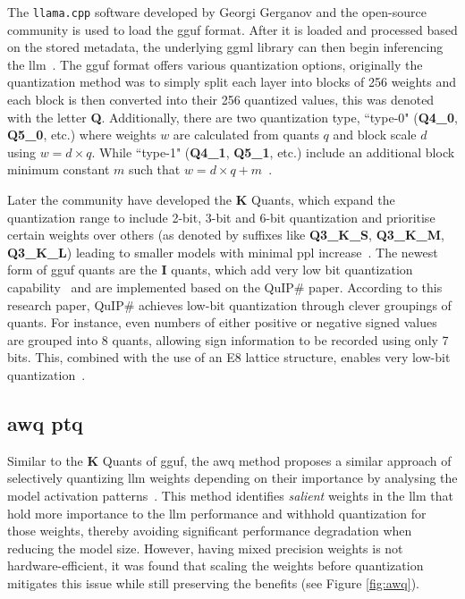 \documentclass{ifacconf}
\begin{document}
	The \texttt{llama.cpp} software developed by Georgi Gerganov and the open-source community is used to load the \gls{gguf} format. After it is loaded and processed based on the stored metadata, the underlying \gls{ggml} library can then begin inferencing the \gls{llm}~\cite{ggufgithub}. The \gls{gguf} format offers various quantization options, originally the quantization method was to simply split each layer into blocks of 256 weights and each block is then converted into their 256 quantized values, this was denoted with the letter \textbf{Q}. Additionally, there are two quantization type, ``type-0" (\textbf{Q4\_0}, \textbf{Q5\_0}, etc.) where weights $w$ are calculated from quants $q$ and block scale $d$ using $w = d \times q$. While ``type-1" (\textbf{Q4\_1}, \textbf{Q5\_1}, etc.) include an additional block minimum constant $m$ such that $w = d \times q + m$~\cite{ggufgithubquantdoc, ggufgithubkquantpr}. 
	
	Later the community have developed the \textbf{K} Quants, which expand the quantization range to include 2-bit, 3-bit and 6-bit quantization and prioritise certain weights over others (as denoted by suffixes like \textbf{Q3\_K\_S}, \textbf{Q3\_K\_M}, \textbf{Q3\_K\_L}) leading to smaller models with minimal \gls{ppl} increase~\cite{ggufgithubkquantpr}. The newest form of \gls{gguf} quants are the \textbf{I} quants, which add very low bit quantization capability~\cite{ggufgithubiquantpr} and are implemented based on the QuIP\# paper. According to this research paper, QuIP\# achieves low-bit quantization through clever groupings of quants. For instance, even numbers of either positive or negative signed values are grouped into 8 quants, allowing sign information to be recorded using only 7 bits. This, combined with the use of an E8 lattice structure, enables very low-bit quantization~\cite{tseng2024quipbetterllmquantization,ggufgithubiquantpr}. 
	
	
	\subsection{\gls{awq} \gls{ptq}}
	
	Similar to the \textbf{K} Quants of \gls{gguf}, the \gls{awq} method proposes a similar approach of selectively quantizing \gls{llm} weights depending on their importance by analysing the model activation patterns~\cite{lin2024awqactivationawareweightquantization}. This method identifies \textit{salient} weights in the \gls{llm} that hold more importance to the \gls{llm} performance and withhold quantization for those weights, thereby avoiding significant performance degradation when reducing the model size. However, having  mixed precision weights is not hardware-efficient, it was found that scaling the weights before quantization mitigates this issue while still preserving the benefits (see Figure \ref{fig:awq}).
	
\end{document}
